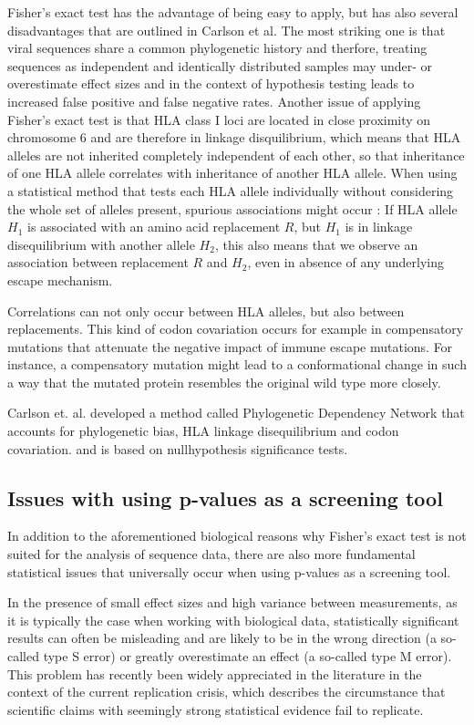 \documentclass[fleqn,11pt]{SelfArx} %
\begin{document}
Fisher's exact test has the advantage of being easy to apply, but has also several 
disadvantages that are outlined in Carlson et al.
The most striking one is that viral sequences share a common phylogenetic history and therfore,
treating sequences as independent and identically distributed samples may under- or
overestimate effect sizes and in the context of hypothesis testing leads to
increased false positive and false negative rates.
Another issue of applying Fisher's exact test is that HLA class I loci are located in
close proximity on chromosome 6 and are therefore in linkage disquilibrium, which means 
that HLA alleles are not inherited completely independent of each other, so that
inheritance of one HLA allele correlates with inheritance of another HLA allele.
When using a statistical method that tests each HLA allele individually without
considering the whole set of alleles present, spurious associations might occur
: If HLA allele \(H_{1}\) is associated with an amino acid replacement \(R\), but
\(H_{1}\) is in linkage disequilibrium with another allele \(H_{2}\), this also means that
we observe an association between replacement \(R\) and \(H_{2}\), even in
absence of any underlying escape mechanism.

Correlations can not only occur between HLA alleles, but also between replacements.
This kind of codon covariation occurs for example in compensatory mutations that
attenuate the negative impact of immune escape mutations. For instance,
a compensatory mutation might lead to a conformational change in such a way that
the mutated protein resembles the original wild type more closely.

Carlson et. al. developed a method called Phylogenetic Dependency Network
that accounts for phylogenetic bias, HLA linkage disequilibrium and codon covariation.
and is based on nullhypothesis significance tests.

\subsection{Issues with using p-values as a screening tool}

In addition to the aforementioned biological reasons why Fisher's exact test is 
not suited for the analysis of sequence data, there are also more fundamental statistical
issues that universally occur when using p-values as a screening tool.

In the presence of small effect sizes and high variance between measurements, as 
it is typically the case when working with biological data, statistically significant
results can often be misleading and are likely to be in the wrong direction
(a so-called type S error) or greatly overestimate an effect (a so-called type M error).
This problem has recently been widely appreciated in the literature in the context
of the current \glqq replication crisis\grqq{}, which describes the circumstance that
scientific claims with seemingly strong statistical evidence fail to replicate.
\end{document}
